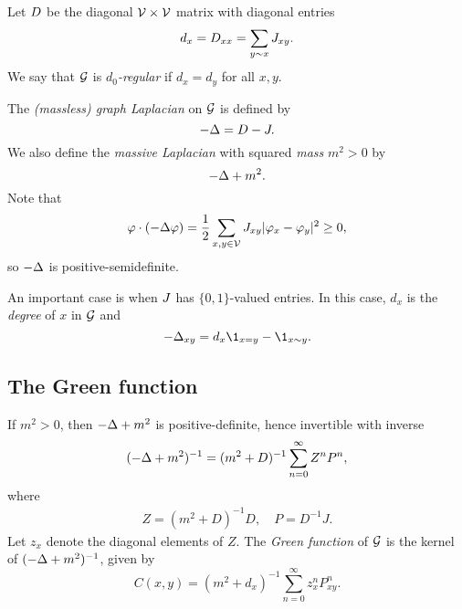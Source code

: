 Let $D$ be the diagonal $\mathcal{V}\times\mathcal{V}$ matrix with diagonal entries
\begin{equation}
d_x = D_{xx} = \sum_{y \sim x} J_{xy}.
\end{equation}
We say that $\mathcal{G}$ is \emph{$d_0$-regular} if $d_x = d_y$ for all $x, y$.

The \emph{(massless) graph Laplacian} on $\mathcal{G}$ is defined by
\begin{equation}
-\Delta = D - J.
\end{equation}
We also define the \emph{massive Laplacian} with squared \emph{mass} $m^2 > 0$
by
\begin{equation}
-\Delta + m^2.
\end{equation}
Note that
\begin{equation}
\varphi \cdot (-\Delta \varphi)
  =
\frac{1}{2} \sum_{x,y\in\mathcal{V}} J_{xy} |\varphi_x - \varphi_y|^2
  \ge
0,
\end{equation}
so $-\Delta$ is positive-semidefinite.

\begin{example}
An important case is when $J$ has $\{0, 1 \}$-valued entries.
In this case, $d_x$ is the \emph{degree} of $x$ in $\mathcal{G}$ and
\begin{equation}
\label{e:Deltaxy}
-\Delta_{xy} = d_x \1_{x=y} - \1_{x \sim y}.
\end{equation}
\end{example}


\subsection{The Green function}

If $m^2 > 0$, then $-\Delta + m^2$ is positive-definite, hence invertible with inverse
\begin{equation}
(-\Delta + m^2)^{-1} = (m^2 + D)^{-1} \sum_{n=0}^\infty Z^n P^n,
\end{equation}
where
\begin{align}
Z = (m^2 + D)^{-1} D,
  \quad
P = D^{-1} J.
\end{align}
Let $z_x$ denote the diagonal elements of $Z$. The \emph{Green function}
of $\mathcal{G}$ is the kernel of $(-\Delta + m^2)^{-1}$, given by
\begin{equation}
\label{e:greendef}
C(x, y)
  =
(m^2 + d_x)^{-1} \sum_{n=0}^\infty z_x^n P^n_{xy}.
\end{equation}


